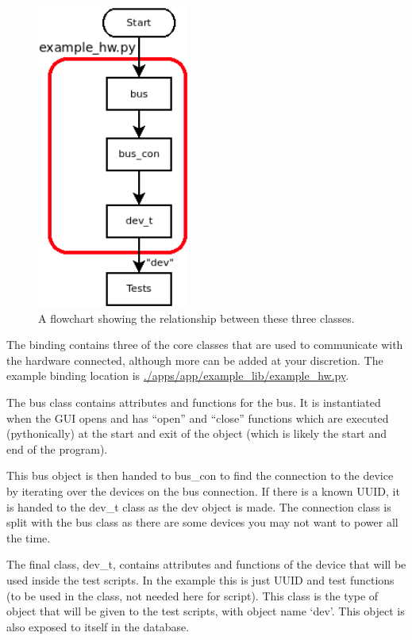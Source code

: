 \documentclass[a4paper,12pt, notitlepage]{article}
\begin{document}
{{{{{{{{{{{\begin{figure}
	\centering
	\includegraphics[width=50mm]{Images/examplehw.png}
	\caption{\small A flowchart showing the relationship between these three classes.}
	\label{fig: examplehw}
\end{figure}

The binding contains three of the core classes that are used to communicate with the hardware connected, although more can be added at your discretion. The example binding location is \url{./apps/app/example_lib/example_hw.py}.

The bus class contains attributes and functions for the bus. It is instantiated when the GUI opens and has “open” and “close” functions which are executed (pythonically) at the start and exit of the object (which is likely the start and end of the program).

This bus object is then handed to bus\_con to find the connection to the device by iterating over the devices on the bus connection. If there is a known UUID, it is handed to the dev\_t class as the dev object is made. The connection class is split with the bus class as there are some devices you may not want to power all the time.

The final class, dev\_t, contains attributes and functions of the device that will be used inside the test scripts. In the example this is just UUID and test functions (to be used in the class, not needed here for script). This class is the type of object that will be given to the test scripts, with object name `dev'. This object is also exposed to itself in the database. 

}}}}}}}}}}}
\end{document}
